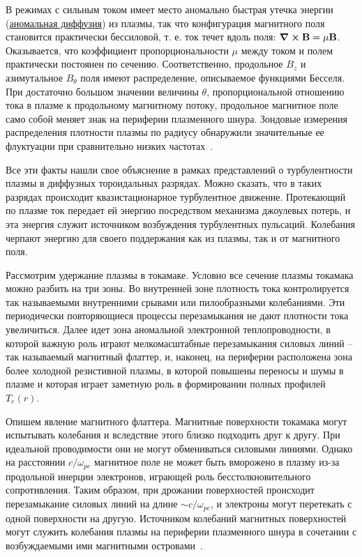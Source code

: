 \documentclass[10pt, a4paper]{article}
\begin{document}
В режимах с сильным током имеет место аномально быстрая утечка энергии (\uline{аномальная диффузия}) из плазмы, так что конфигурация магнитного поля становится практически бессиловой, т. е. ток течет вдоль поля: $\curl{\vb{B}} = \mu\vb{B}$. Оказывается, что коэффициент пропорциональности $\mu$ между током и полем практически постоянен по сечению. Соответственно, продольное $B_z$ и азимутальное $B_\theta$ поля имеют распределение, описываемое функциями Бесселя. При достаточно большом значении величины $\theta$, пропорциональной отношению тока в плазме к продольному магнитному потоку, продольное магнитное поле само собой меняет знак на периферии плазменного шнура. Зондовые измерения распределения плотности плазмы по радиусу обнаружили значительные ее флуктуации при сравнительно низких частотах~\cite{kadomtsev}.

Все эти факты нашли свое объяснение в рамках представлений о турбулентности плазмы в диффузных тороидальных разрядах. Можно сказать, что в таких разрядах происходит квазистационарное турбулентное движение. Протекающий по плазме ток передает ей энергию посредством механизма джоулевых потерь, и эта энергия служит источником возбуждения турбулентных пульсаций. Колебания черпают энергию для своего поддержания как из плазмы, так и от магнитного поля.

Рассмотрим удержание плазмы в токамаке. Условно все сечение плазмы токамака можно разбить на три зоны. Во внутренней зоне плотность тока контролируется так называемыми внутренними срывами или пилообразными колебаниями. Эти периодически повторяющиеся процессы перезамыкания не дают плотности тока увеличиться. Далее идет зона аномальной электронной теплопроводности, в которой важную роль играют мелкомасштабные перезамыкания силовых линий -- так называемый магнитный флаттер, и, наконец, на периферии расположена зона более холодной резистивной плазмы, в которой повышены переносы и шумы в плазме и которая играет заметную роль в формировании полных профилей $T_e(r)$.

Опишем явление магнитного флаттера. Магнитные поверхности токамака могут испытывать колебания и вследствие этого близко подходить друг к другу. При идеальной проводимости они не могут обмениваться силовыми линиями. Однако на расстоянии $c/\omega_{pe}$ магнитное поле не может быть вморожено в плазму из-за продольной инерции электронов, играющей роль бесстолкновительного сопротивления. Таким образом, при дрожании поверхностей происходит перезамыкание силовых линий на длине $\sim c/\omega_{pe}$, и электроны могут перетекать с одной поверхности на другую. Источником колебаний магнитных поверхностей могут служить колебания плазмы на периферии плазменного шнура в сочетании с возбуждаемыми ими магнитными островами~\cite{kadomtsev}.
\end{document}

